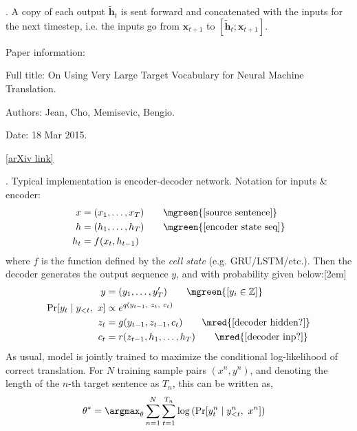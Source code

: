 \documentclass[11pt]{article}
\renewcommand\vec[2][]{\bm{#2}_{#1}}
\newcommand\myspace[1][]{\vspace{#1\bigskipamount}}
\newcommand\p{\Needspace{10\baselineskip} \noindent}
\begin{document}
\myspace
\p {}. A copy of each output $\vec[t]{\tilde h}$ is sent forward and concatenated with the inputs for the next timestep, i.e. the inputs go from $\vec[t+1]{x}$ to $[\vec[t]{\tilde h}; \vec[t+1]{x}]$. 



\p Paper information:
\begin{compactitem}[-]
	\item Full title: On Using Very Large Target Vocabulary for Neural Machine Translation. 
	\item Authors: Jean, Cho, Memisevic, Bengio.
	\item Date: 18 Mar 2015. 
	\item \href{https://arxiv.org/abs/1412.2007}{[arXiv link]}
\end{compactitem}


\myspace
\p {}. Typical implementation is encoder-decoder network. Notation for inputs \& encoder:
\begin{align}
x &= (x_1, \ldots, x_T)
\qquad \mgreen{\text{[source sentence]}} \\
h &= (h_1, \ldots, h_T)
\qquad \mgreen{\text{[encoder state seq]}} \\
h_t &= f(x_t, h_{t - 1}) \label{h}
\end{align}
where $f$ is the function defined by the \textit{cell state} (e.g. GRU/LSTM/etc.). Then the decoder generates the output sequence $y$, and with probability given below:[2em]
\begin{align}
y &= (y_1, \ldots, y_T') \qquad \mgreen{[y_i \in \mathbb{Z}]} \\
\Pr[y_t \mid y_{<t}, ~ x] &\propto e^{q(y_{t-1},~ z_t, ~ c_t)}  \label{y}\\
z_t &= g(y_{t - 1}, z_{t - 1}, c_t) 
\qquad \mred{\text{[decoder hidden?]}} \label{z} \\
c_t &= r(z_{t - 1}, h_1, \ldots, h_T) 
\qquad \mred{\text{[decoder inp?]}} \label{c}
\end{align}
As usual, model is jointly trained to maximize the conditional log-likelihood of correct translation. For $N$ training sample pairs $(x^n, y^n)$, and denoting the length of the $n$-th target sentence as $T_n$, this can be written as,
\begin{align}
\theta^* &= \argmax_\theta \sum_{n = 1}^{N} \sum_{t = 1}^{T_n}
\log\left(\Pr[y_t^n \mid y_{<t}^n, ~ x^n]  \right)
\end{align}
\end{document}
